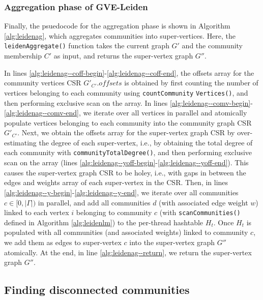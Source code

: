 \subsubsection{Aggregation phase of GVE-Leiden}

Finally, the psuedocode for the aggregation phase is shown in Algorithm \ref{alg:leidenag}, which aggregates communities into super-vertices. Here, the \texttt{leidenAggregate()} function takes the current graph $G'$ and the community membership $C'$ as input, and returns the super-vertex graph $G''$.

In lines \ref{alg:leidenag--coff-begin}-\ref{alg:leidenag--coff-end}, the offsets array for the community vertices CSR $G'_{C'}.offsets$ is obtained by first counting the number of vertices belonging to each community using \texttt{countCommunity} \texttt{Vertices()}, and then performing exclusive scan on the array. In lines \ref{alg:leidenag--comv-begin}-\ref{alg:leidenag--comv-end}, we iterate over all vertices in parallel and atomically populate vertices belonging to each community into the community graph CSR $G'_{C'}$. Next, we obtain the offsets array for the super-vertex graph CSR by over-estimating the degree of each super-vertex, i.e., by obtaining the total degree of each community with \texttt{communityTotalDegree()}, and then performing exclusive scan on the array (lines \ref{alg:leidenag--yoff-begin}-\ref{alg:leidenag--yoff-end}). This causes the super-vertex graph CSR to be holey, i.e., with gaps in between the edges and weights array of each super-vertex in the CSR. Then, in lines \ref{alg:leidenag--y-begin}-\ref{alg:leidenag--y-end}, we iterate over all communities $c \in [0, |\Gamma|)$ in parallel, and add all communities $d$ (with associated edge weight $w$) linked to each vertex $i$ belonging to community $c$ (with \texttt{scanCommunities()} defined in Algorithm \ref{alg:leidenlm}) to the per-thread hashtable $H_t$. Once $H_t$ is populated with all communities (and associated weights) linked to community $c$, we add them as edges to super-vertex $c$ into the super-vertex graph $G''$ atomically. At the end, in line \ref{alg:leidenag--return}, we return the super-vertex graph $G''$.






\subsection{Finding disconnected communities}

